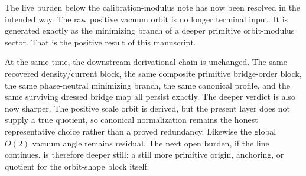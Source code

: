 \documentclass[11pt]{article}
\begin{document}
The live burden below the calibration-modulus note has now been resolved in the intended way. The raw positive vacuum orbit is no longer terminal input. It is generated exactly as the minimizing branch of a deeper primitive orbit-modulus sector. That is the positive result of this manuscript.

At the same time, the downstream derivational chain is unchanged. The same recovered density/current block, the same composite primitive bridge-order block, the same phase-neutral minimizing branch, the same canonical profile, and the same surviving dressed bridge map all persist exactly. The deeper verdict is also now sharper. The positive scale orbit is derived, but the present layer does not supply a true quotient, so canonical normalization remains the honest representative choice rather than a proved redundancy. Likewise the global \(O(2)\) vacuum angle remains residual. The next open burden, if the line continues, is therefore deeper still: a still more primitive origin, anchoring, or quotient for the orbit-shape block itself.
\end{document}
